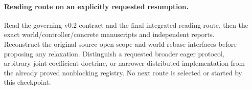 \documentclass{article}\usepackage{amsmath,amssymb,url}
\begin{document}
\paragraph{Reading route on an explicitly requested resumption.} Read the governing v0.2 contract and the final integrated reading route, then the exact world/controller/concrete manuscripts and independent reports. Reconstruct the original source open-scope and world-rebase interfaces before proposing any relaxation. Distinguish a requested broader eager protocol, arbitrary joint coefficient doctrine, or narrower distributed implementation from the already proved nonblocking registry. No next route is selected or started by this checkpoint.
\end{document}
